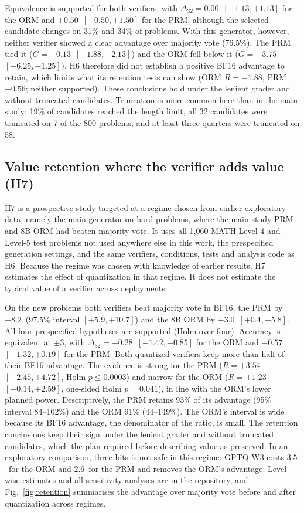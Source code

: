 Equivalence is supported for both verifiers, with $\Delta_{32} = 0.00$\pp\ $[-1.13,
+1.13]$ for the ORM and $+0.50$\pp\ $[-0.50, +1.50]$ for the PRM, although the selected
candidate changes on 31\% and 34\% of problems. With this generator, however, neither
verifier showed a clear advantage over majority vote (76.5\%). The PRM tied it ($G =
+0.13$\pp\ $[-1.88, +2.13]$) and the ORM fell below it ($G = -3.75$\pp\ $[-6.25,
-1.25]$). H6 therefore did not establish a positive BF16 advantage to retain, which
limits what its retention tests can show (ORM $R = -1.88$\pp, PRM $+0.56$\pp; neither
supported). These conclusions hold under the lenient grader and without truncated
candidates. Truncation is more common here than in the main study: 19\% of candidates
reached the length limit, all 32 candidates were truncated on 7 of the 800 problems, and
at least three quarters were truncated on 58.

\subsection{Value retention where the verifier adds value (H7)}\label{sec:h7}

H7 is a prospective study targeted at a regime chosen from earlier exploratory
data, namely the main generator on hard problems, where the main-study PRM and 8B ORM had
beaten majority vote. It uses all 1,060 MATH Level-4 and Level-5 test problems not used
anywhere else in this work, the prespecified generation settings, and the same
verifiers, conditions, tests and analysis code as H6. Because the regime was chosen with
knowledge of earlier results, H7 estimates the effect of quantization in that regime. It
does not estimate the typical value of a verifier across deployments.

On the new problems both verifiers beat majority vote in BF16, the PRM by $+8.2$\pp\
(97.5\% interval $[+5.9, +10.7]$) and the 8B ORM by $+3.0$\pp\ $[+0.4, +5.8]$. All four
prespecified hypotheses are supported (Holm over four). Accuracy is equivalent at
$\pm3$\pp, with $\Delta_{32} = -0.28$\pp\ $[-1.42, +0.85]$ for the ORM and $-0.57$\pp\
$[-1.32, +0.19]$ for the PRM. Both quantized verifiers keep more than half of their BF16
advantage. The evidence is strong for the PRM ($R = +3.54$\pp\ $[+2.45, +4.72]$, Holm
$p \le 0.0003$) and narrow for the ORM ($R = +1.23$\pp\ $[-0.14, +2.59]$, one-sided Holm
$p = 0.041$), in line with the ORM's lower planned power. Descriptively, the PRM retains
93\% of its advantage (95\% interval 84--102\%) and the ORM 91\% (44--149\%). The ORM's
interval is wide because its BF16 advantage, the denominator of the ratio, is small. The
retention conclusions keep their sign under the lenient grader and without truncated
candidates, which the plan required before describing value as preserved. In an
exploratory comparison, three bits is not safe in this regime: GPTQ-W3 costs $3.5$\pp\
for the ORM and $2.6$\pp\ for the PRM and removes the ORM's advantage. Level-wise
estimates and all sensitivity analyses are in the repository, and
Fig.~\ref{fig:retention} summarises the advantage over majority vote before and after
quantization across regimes.

